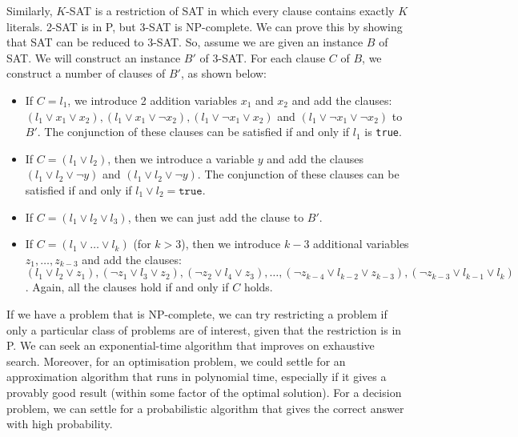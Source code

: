 \documentclass[a4paper, openany]{memoir}
\begin{document}
Similarly, $K$-SAT is a restriction of SAT in which every clause contains exactly $K$ literals. 2-SAT is in P, but 3-SAT is NP-complete. We can prove this by showing that SAT can be reduced to 3-SAT. So, assume we are given an instance $B$ of SAT. We will construct an instance $B'$ of 3-SAT. For each clause $C$ of $B$, we construct a number of clauses of $B'$, as shown below:
\begin{itemize}
    \item If $C = l_1$, we introduce 2 addition variables $x_1$ and $x_2$ and add the clauses: $(l_1 \lor x_1 \lor x_2), (l_1 \lor x_1 \lor \lnot x_2), (l_1 \lor \lnot x_1 \lor x_2)$ and $(l_1 \lor \lnot x_1 \lor \lnot x_2)$ to $B'$. The conjunction of these clauses can be satisfied if and only if $l_1$ is \texttt{true}.
    \item If $C = (l_1 \lor l_2)$, then we introduce a variable $y$ and add the clauses $(l_1 \lor l_2 \lor \lnot y)$ and $(l_1 \lor l_2 \lor \lnot y)$. The conjunction of these clauses can be satisfied if and only if $l_1 \lor l_2 = \texttt{true}$.
    \item If $C = (l_1 \lor l_2 \lor l_3)$, then we can just add the clause to $B'$.
    \item If $C = (l_1 \lor \dots \lor l_k)$ (for $k > 3$), then we introduce $k-3$ additional variables $z_1, \dots, z_{k-3}$ and add the clauses: $(l_1 \lor l_2 \lor z_1), (\lnot z_1 \lor l_3 \lor z_2), (\lnot z_2 \lor l_4 \lor z_3), \dots, (\lnot z_{k-4} \lor l_{k-2} \lor z_{k-3}), (\lnot z_{k-3} \lor l_{k-1} \lor l_k)$. Again, all the clauses hold if and only if $C$ holds.
\end{itemize}

If we have a problem that is NP-complete, we can try restricting a problem if only a particular class of problems are of interest, given that the restriction is in P. We can seek an exponential-time algorithm that improves on exhaustive search. Moreover, for an optimisation problem, we could settle for an approximation algorithm that runs in polynomial time, especially if it gives a provably good result (within some factor of the optimal solution). For a decision problem, we can settle for a probabilistic algorithm that gives the correct answer with high probability.
\end{document}
